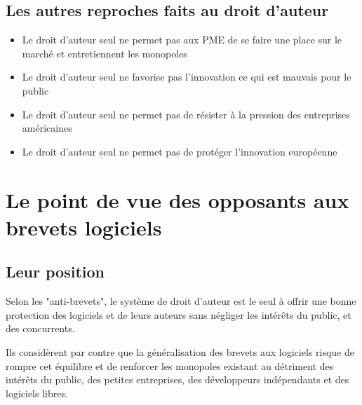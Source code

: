 \documentclass[pdftex,a4paper,11pt]{report}
\begin{document}
\subsection{Les autres reproches faits au droit d'auteur}
\begin{itemize}
\item Le droit d'auteur seul ne permet pas aux PME de se faire une place sur le marché et entretiennent les monopoles
\item Le droit d'auteur seul ne favorise pas l'innovation ce qui est mauvais pour le public
\item Le droit d'auteur seul ne permet pas de résister à la pression des entreprises américaines
\item Le droit d'auteur seul ne permet pas de protéger l’innovation européenne
\end{itemize}

\section{Le point de vue des opposants aux brevets logiciels}
\subsection{Leur position}
Selon les "anti-brevets", le système de droit d'auteur est le seul à offrir une bonne protection des logiciels et de leurs auteurs sans négliger les intérêts du public, et des concurrents.

Ils considèrent par contre que la généralisation des brevets aux logiciels risque de rompre cet équilibre et de renforcer les monopoles existant au détriment des intérêts du public, des petites entreprises, des développeurs indépendants et des logiciels libres.
\end{document}
